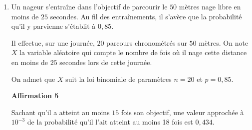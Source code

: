 \documentclass[10pt]{article}
\begin{document}
\begin{enumerate}
\textbf{Affirmation 4}

$P(Y=4) = 0,25$.

\item Un nageur s'entraîne dans l'objectif de parcourir le $50$ mètres nage libre en moins de $25$ secondes. Au fil des entraînements, il s'avère que la probabilité qu'il y parvienne s'établit à $0,85$.

Il effectue, sur une journée, $20$ parcours chronométrés sur $50$ mètres. On note $X$ la variable  aléatoire qui compte le nombre de fois où il nage cette distance en moins de $25$ secondes lors de cette journée.

On admet que $X$ suit la loi binomiale de paramètres $n = 20$ et $p = 0,85$.

\textbf{Affirmation 5}

Sachant qu'il a atteint au moins $15$ fois son objectif, une valeur approchée à $10^{-3}$ de la probabilité qu'il l'ait atteint au moins 18 fois est $0,434$.
\end{enumerate}

\bigskip
\end{document}
